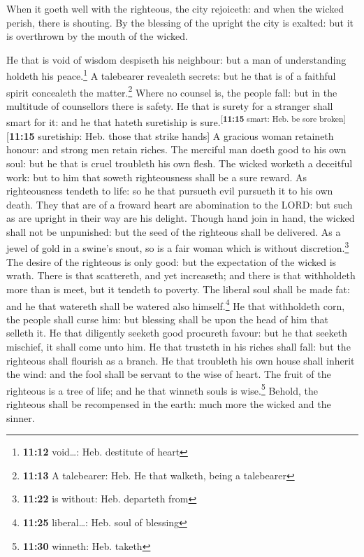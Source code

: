  When it goeth well with the righteous, the city
rejoiceth: and when the wicked perish, there is shouting.
 By the blessing of the upright the city is exalted: but
it is overthrown by the mouth of the wicked.

 He that is void of wisdom despiseth his neighbour: but a
man of understanding holdeth his peace.\footnote{\textbf{11:12}
  void\ldots: Heb. destitute of heart}  A talebearer
revealeth secrets: but he that is of a faithful spirit concealeth the
matter.\footnote{\textbf{11:13} A talebearer: Heb. He that walketh,
  being a talebearer}  Where no counsel is, the people
fall: but in the multitude of counsellors there is safety.
 He that is surety for a stranger shall smart for it: and
he that hateth suretiship is sure.\textsuperscript{{[}\textbf{11:15}
smart: Heb. be sore broken{]}}{[}\textbf{11:15} suretiship: Heb. those
that strike hands{]}  A gracious woman retaineth honour:
and strong men retain riches.  The merciful man doeth
good to his own soul: but he that is cruel troubleth his own flesh.
 The wicked worketh a deceitful work: but to him that
soweth righteousness shall be a sure reward.  As
righteousness tendeth to life: so he that pursueth evil pursueth it to
his own death.  They that are of a froward heart are
abomination to the LORD: but such as are upright in their way are his
delight.  Though hand join in hand, the wicked shall not
be unpunished: but the seed of the righteous shall be delivered.
 As a jewel of gold in a swine's snout, so is a fair
woman which is without discretion.\footnote{\textbf{11:22} is without:
  Heb. departeth from}  The desire of the righteous is
only good: but the expectation of the wicked is wrath. 
There is that scattereth, and yet increaseth; and there is that
withholdeth more than is meet, but it tendeth to poverty.
 The liberal soul shall be made fat: and he that watereth
shall be watered also himself.\footnote{\textbf{11:25} liberal\ldots:
  Heb. soul of blessing}  He that withholdeth corn, the
people shall curse him: but blessing shall be upon the head of him that
selleth it.  He that diligently seeketh good procureth
favour: but he that seeketh mischief, it shall come unto him.
 He that trusteth in his riches shall fall: but the
righteous shall flourish as a branch.  He that troubleth
his own house shall inherit the wind: and the fool shall be servant to
the wise of heart.  The fruit of the righteous is a tree
of life; and he that winneth souls is wise.\footnote{\textbf{11:30}
  winneth: Heb. taketh}  Behold, the righteous shall be
recompensed in the earth: much more the wicked and the sinner.

